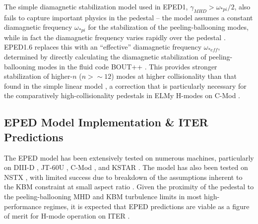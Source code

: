 The simple diamagnetic stabilization model used in EPED1, $\gamma_{MHD} > \omega_{*pi}/2$, also fails to capture important physics in the pedestal -- the model assumes a constant diamagnetic frequency $\omega_{*pi}$ for the stabilization of the peeling-ballooning modes, while in fact the diamagnetic frequency varies rapidly over the pedestal \cite{Snyder2010}.  EPED1.6 replaces this with an ``effective'' diamagnetic frequency $\omega_{*eff}$, determined by directly calculating the diamagnetic stabilization of peeling-ballooning modes in the fluid code BOUT++ \cite{Xu2010,Xia2013}.  This provides stronger stabilization of higher-$n$ ($n > \sim 12$) modes at higher collisionality than that found in the simple linear model \cite{Snyder2011,Hughes2013}, a correction that is particularly necessary for the comparatively high-collisionality pedestals in ELMy H-modes on C-Mod \cite{Hughes2013}.

\subsection{EPED Model Implementation \& ITER Predictions}\label{subsec:mod_eped_iter}

The EPED model has been extensively tested on numerous machines, particularly on DIII-D \cite{Snyder2011,Groebner2013}, JT-60U \cite{Snyder2009a}, C-Mod \cite{Walk2012}, and KSTAR \cite{Han2013}.  The model has also been tested on NSTX \cite{Groebner2013}, with limited success due to breakdown of the assumptions inherent to the KBM constraint at small aspect ratio \cite{Snyder2009a}.  Given the proximity of the pedestal to the peeling-ballooning MHD and KBM turbulence limits in most high-performance regimes, it is expected that EPED predictions are viable as a figure of merit for H-mode operation on ITER \cite{Snyder2011,Snyder2012}.

\begin{figure}[ht]
 \pushtooutside
\end{figure}

